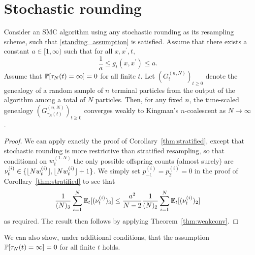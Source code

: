 \section{Stochastic rounding}

\begin{corollary}\label{thm:stochrounding}
Consider an SMC algorithm using any stochastic rounding as its resampling scheme, such that \ref{standing_assumption} is satisfied.
Assume that there exists a constant $a\in [1,\infty)$ such that for all $x, x^\prime, t$,
\begin{equation*}
\frac{1}{a} \leq g_t(x, x^\prime) \leq a . 
\end{equation*}
Assume that $\mathbb{P}[ \tau_N(t) = \infty] =0$ for all finite $t$.
Let $(G_t^{(n,N)})_{t\geq0}$ denote the genealogy of a random sample of $n$ terminal particles from the output of the algorithm among a total of $N$ particles. Then, for any fixed $n$, the time-scaled genealogy $(G_{\tau_N(t)}^{(n,N)})_{t\geq0}$ converges weakly to Kingman's $n$-coalescent as $N\to \infty$.%
\end{corollary}

\begin{proof}
We can apply exactly the proof of Corollary~\ref{thm:stratified}, except that stochastic rounding is more restrictive than stratified resampling, so that conditional on $w_t^{(1:N)}$ the only possible offspring counts (almost surely) are $\nu_t^{(i)} \in \{ \lfloor N w_t^{(i)} \rfloor, \lfloor N w_t^{(i)} \rfloor +1 \}$. We simply set $p_{-1}^{(i)} = p_{2}^{(i)} = 0$ in the proof of Corollary~\ref{thm:stratified} to see that
\begin{equation*}
\frac{1}{(N)_3} \sum_{i=1}^{N} \mathbb{E}_t [(\nu_t^{(i)})_3 ]
\leq \frac{a^2}{N-2} \frac{1}{(N)_2} \sum_{i=1}^{N} \mathbb{E}_t [(\nu_t^{(i)})_2 ]
\end{equation*}
as required.
The result then follows by applying Theorem~\ref{thm:weakconv}.
\end{proof}
We can also show, under additional conditions, that the assumption $\mathbb{P}[ \tau_N(t) = \infty ] =0$ for all finite $t$ holds.

